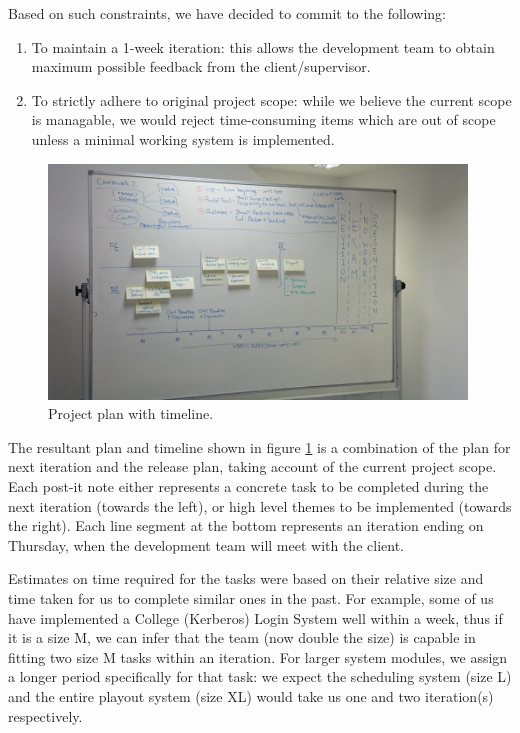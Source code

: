 \documentclass[a4paper]{article}
\begin{document}
Based on such constraints, we have decided to commit to the following:
\begin{enumerate}
  \item To maintain a 1-week iteration: this allows the development team to
        obtain maximum possible feedback from the client/supervisor.
  \item To strictly adhere to original project scope: while we believe the
        current scope is managable, we would reject time-consuming items which
        are out of scope unless a minimal working system is implemented.
\end{enumerate}


\begin{figure}[h]
  \centering
    \includegraphics[width = 0.99\textwidth]{./planning/timeline.jpg}
   
  \caption{Project plan with timeline.}
  \label{fig:timeline}
\end{figure}

The resultant plan and timeline shown in figure \ref{fig:timeline} is a
combination of the plan for next iteration and the release plan, taking account
of the current project scope. Each post-it note either represents a 
concrete task to be completed during the next iteration (towards the left), or
high level themes to be implemented (towards the right). Each line segment at
the bottom represents an iteration ending on Thursday, when the development
team will meet with the client.

Estimates on time required for the tasks were based on their relative size and
time taken for us to complete similar ones in the past. For example, some of us
have implemented a College (Kerberos) Login System well within a week, thus if
it is a size M, we can infer that the team (now double the size) is capable in 
fitting two size M tasks within an iteration. For larger system modules, we
assign a longer period specifically for that task: we expect the scheduling
system (size L) and the entire playout system (size XL) would take us one and
two iteration(s) respectively.
\end{document}
